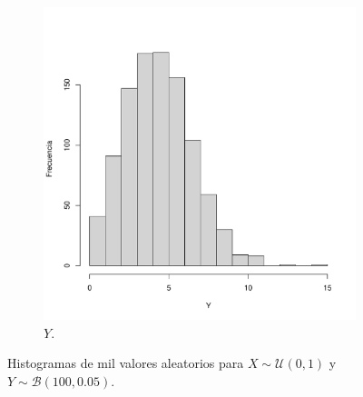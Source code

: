 \documentclass[paper=leter, fontsize=11pt]{scrartcl}
\begin{document}
\begin{figure}
\begin{subfigure}{0.5\textwidth}
      \includegraphics[scale=0.4]{Y.pdf}
      \caption{$Y$.}
  \end{subfigure}
  \caption{Histogramas de mil valores aleatorios para $X \sim \mathcal{U}(0,1)$ y $Y \sim \mathcal{B} (100, 0.05)$.}
  \label{XY}
\end{figure}



\end{document}
